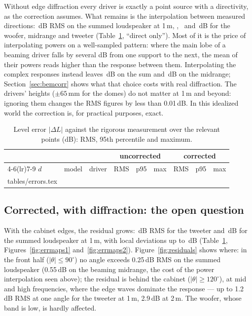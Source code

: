 \documentclass[11pt,a4paper]{article}
\makeatletter
\newcommand{\rows}[1]{\@@input tables/#1.tex }
\makeatother
\begin{document}
Without edge diffraction every driver is exactly a point source with a directivity, as the
correction assumes. What remains is the interpolation between measured directions:
\sysDirCorOne\,dB RMS on the summed loudspeaker at 1\,m, \wfDirCorOne, \midDirCorOne\ and
\twDirCorOne\,dB for the woofer, midrange and tweeter (Table~\ref{tab:errors}, ``direct only''). Most of
it is the price of interpolating powers on a well-sampled pattern: where the main lobe of a beaming
driver falls by several dB from one support to the next, the mean of their powers reads higher than the
response between them. Interpolating the complex responses instead leaves \sysDirCpxOne\,dB on the sum
and \midDirCpxOne\,dB on the midrange; Section~\ref{sec:bemcorr} shows what that choice costs with real
diffraction. The drivers' heights ($\pm65$\,mm for the domes) do not matter at 1\,m and beyond: ignoring
them changes the RMS figures by less than 0.01\,dB. In this idealized world the correction is, for
practical purposes, exact.

\begin{table}[tbp]
  \centering
  \caption{Level error $|\Delta L|$ against the rigorous measurement over the relevant points (dB): RMS,
  95th percentile and maximum.}
  \label{tab:errors}
  \small
  \begin{tabular}{lllcccccc}
    \toprule
    & & & \multicolumn{3}{c}{uncorrected} & \multicolumn{3}{c}{corrected}\\
    \cmidrule(lr){4-6}\cmidrule(lr){7-9}
    $d$ & model & driver & RMS & p95 & max & RMS & p95 & max\\
    \midrule
    \rows{errors}
    \bottomrule
  \end{tabular}
\end{table}

\subsection{Corrected, with diffraction: the open question}

With the cabinet edges, the residual grows: \twCorOne\,dB RMS for the tweeter and \sysCorOne\,dB for
the summed loudspeaker at 1\,m, with local deviations up to \twmaxCorOne\,dB (Table~\ref{tab:errors},
Figures~\ref{fig:errmaps1} and~\ref{fig:errmaps2}). Figure~\ref{fig:residuals} shows where: in the
front half ($|\theta|\le90^\circ$) no angle exceeds 0.25\,dB RMS on the summed loudspeaker (0.55\,dB on
the beaming midrange, the cost of the power interpolation seen above); the residual is behind the cabinet
($|\theta|\ge120^\circ$), at mid and high frequencies, where the edge waves dominate the response --- up to
1.2\,dB RMS at one angle for the tweeter at 1\,m, 2.9\,dB at 2\,m. The woofer, whose band is low, is hardly
affected.
\end{document}
